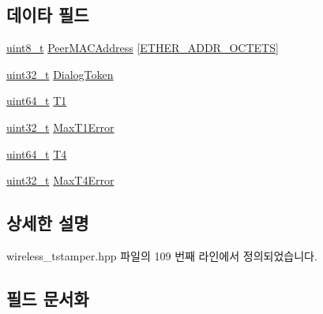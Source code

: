 \subsection*{데이타 필드}
\begin{DoxyCompactItemize}
\item 
\hyperlink{stdint_8h_aba7bc1797add20fe3efdf37ced1182c5}{uint8\+\_\+t} \hyperlink{struct___t_i_m_i_n_g_m_s_m_t___c_o_n_f_i_r_m___e_v_e_n_t___d_a_t_a_a08d9c385ed7bbc6dd95bd8dedb74d8c1}{Peer\+M\+A\+C\+Address} \mbox{[}\hyperlink{packet_8hpp_ab81d402a4929723091a6731508845125}{E\+T\+H\+E\+R\+\_\+\+A\+D\+D\+R\+\_\+\+O\+C\+T\+E\+TS}\mbox{]}
\item 
\hyperlink{parse_8c_a6eb1e68cc391dd753bc8ce896dbb8315}{uint32\+\_\+t} \hyperlink{struct___t_i_m_i_n_g_m_s_m_t___c_o_n_f_i_r_m___e_v_e_n_t___d_a_t_a_a5fb015f69f95b9ee9e4f1598c4dc04f0}{Dialog\+Token}
\item 
\hyperlink{parse_8c_aec6fcb673ff035718c238c8c9d544c47}{uint64\+\_\+t} \hyperlink{struct___t_i_m_i_n_g_m_s_m_t___c_o_n_f_i_r_m___e_v_e_n_t___d_a_t_a_ac36cc42a03c3d7eaa0966808eb492866}{T1}
\item 
\hyperlink{parse_8c_a6eb1e68cc391dd753bc8ce896dbb8315}{uint32\+\_\+t} \hyperlink{struct___t_i_m_i_n_g_m_s_m_t___c_o_n_f_i_r_m___e_v_e_n_t___d_a_t_a_a3d7b08143ed2de0d074093ec3256c18e}{Max\+T1\+Error}
\item 
\hyperlink{parse_8c_aec6fcb673ff035718c238c8c9d544c47}{uint64\+\_\+t} \hyperlink{struct___t_i_m_i_n_g_m_s_m_t___c_o_n_f_i_r_m___e_v_e_n_t___d_a_t_a_a8cea6315d4cb7873c4a4440330e6453f}{T4}
\item 
\hyperlink{parse_8c_a6eb1e68cc391dd753bc8ce896dbb8315}{uint32\+\_\+t} \hyperlink{struct___t_i_m_i_n_g_m_s_m_t___c_o_n_f_i_r_m___e_v_e_n_t___d_a_t_a_a9ea11f025561c01c068097043b6a583c}{Max\+T4\+Error}
\end{DoxyCompactItemize}


\subsection{상세한 설명}


wireless\+\_\+tstamper.\+hpp 파일의 109 번째 라인에서 정의되었습니다.



\subsection{필드 문서화}
